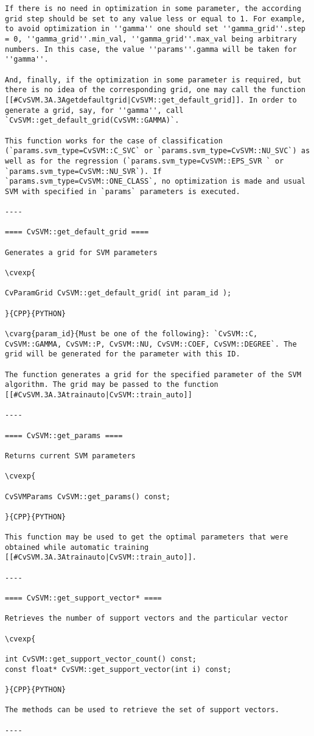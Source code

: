 \begin{verbatim}
If there is no need in optimization in some parameter, the according grid step should be set to any value less or equal to 1. For example, to avoid optimization in ''gamma'' one should set ''gamma_grid''.step = 0, ''gamma_grid''.min_val, ''gamma_grid''.max_val being arbitrary numbers. In this case, the value ''params''.gamma will be taken for ''gamma''.

And, finally, if the optimization in some parameter is required, but there is no idea of the corresponding grid, one may call the function [[#CvSVM.3A.3Agetdefaultgrid|CvSVM::get_default_grid]]. In order to generate a grid, say, for ''gamma'', call `CvSVM::get_default_grid(CvSVM::GAMMA)`.

This function works for the case of classification (`params.svm_type=CvSVM::C_SVC` or `params.svm_type=CvSVM::NU_SVC`) as well as for the regression (`params.svm_type=CvSVM::EPS_SVR ` or `params.svm_type=CvSVM::NU_SVR`). If `params.svm_type=CvSVM::ONE_CLASS`, no optimization is made and usual SVM with specified in `params` parameters is executed.

----

==== CvSVM::get_default_grid ====

Generates a grid for SVM parameters

\cvexp{

CvParamGrid CvSVM::get_default_grid( int param_id );

}{CPP}{PYTHON}

\cvarg{param_id}{Must be one of the following}: `CvSVM::C, CvSVM::GAMMA, CvSVM::P, CvSVM::NU, CvSVM::COEF, CvSVM::DEGREE`. The grid will be generated for the parameter with this ID.

The function generates a grid for the specified parameter of the SVM algorithm. The grid may be passed to the function [[#CvSVM.3A.3Atrainauto|CvSVM::train_auto]]

----

==== CvSVM::get_params ====

Returns current SVM parameters

\cvexp{

CvSVMParams CvSVM::get_params() const;

}{CPP}{PYTHON}

This function may be used to get the optimal parameters that were obtained while automatic training [[#CvSVM.3A.3Atrainauto|CvSVM::train_auto]].

----

==== CvSVM::get_support_vector* ====

Retrieves the number of support vectors and the particular vector

\cvexp{

int CvSVM::get_support_vector_count() const;
const float* CvSVM::get_support_vector(int i) const;

}{CPP}{PYTHON}

The methods can be used to retrieve the set of support vectors.

----

\end{verbatim}

